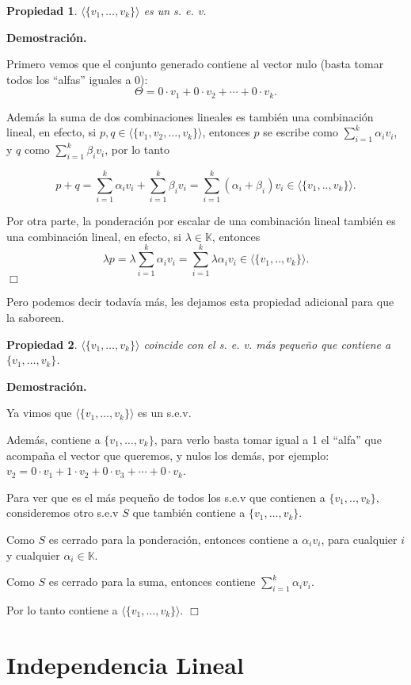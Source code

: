 \documentclass[12pt]{book}
\newtheorem{prop}{Propiedad}
\def\K{\mathbb{K}}
\begin{document}
\begin{prop}
$\langle \{v_1,\dots,v_k\}\rangle$ es un s. e. v.
\end{prop}
{\bf Demostración.} {
Primero vemos que el conjunto generado contiene al vector nulo (basta tomar todos los ``alfas'' iguales a 0): 
$$\Theta=0\cdot v_1+0\cdot v_2+\cdots+0\cdot v_k.$$

Además la suma de dos combinaciones lineales es también una combinación lineal, en efecto, si $p,q\in\langle\{v_1,v_2,\dots,v_k\}\rangle$, entonces $p$ se escribe como $\sum_{i=1}^k\alpha_iv_i$, y $q$ como $\sum_{i=1}^k\beta_iv_i$, por lo tanto

$$p+q=\sum_{i=1}^k\alpha_iv_i+\sum_{i=1}^k\beta_iv_i=\sum_{i=1}^k(\alpha_i+\beta_i)v_i\in\langle \{v_1,..,v_k\}\rangle.$$

Por otra parte, la ponderación por escalar de una combinación lineal también es una combinación lineal, en efecto, si $\lambda\in\K$, entonces 
$$\lambda p=\lambda\sum_{i=1}^k\alpha_iv_i=\sum_{i=1}^k\lambda\alpha_iv_i\in \langle \{v_1,..,v_k\}\rangle.$$
\hfill $\Box$
    }

Pero podemos decir todavía más, les dejamos esta propiedad adicional para que la saboreen.


\begin{prop}
$\langle \{v_1,\dots,v_k\}\rangle$ coincide con el s. e. v. m\'as peque\~no que contiene a $\{v_1,\dots,v_k\}$.
\end{prop}
    {\bf Demostración.} {
Ya vimos que $\langle \{v_1,\dots,v_k\}\rangle$ es un s.e.v. 

Además, contiene a $\{v_1,\dots,v_k\}$, para verlo basta tomar igual a 1 el ``alfa'' que acompaña el vector que queremos, y nulos los demás, por ejemplo: $v_2=0\cdot v_1+1\cdot v_2+0\cdot v_3+\cdots+0\cdot v_k$.

Para ver que es el más pequeño de todos los s.e.v que contienen a $\{v_1,..,v_k\}$, consideremos otro s.e.v $S$ que también contiene a $\{v_1,\dots,v_k\}$.

Como $S$ es cerrado para la ponderación, entonces contiene a $\alpha_iv_i$, para cualquier $i$ y cualquier $\alpha_i\in\K$.

Como $S$ es cerrado para la suma, entonces contiene $\sum_{i=1}^k\alpha_iv_i$.

Por lo tanto contiene a $\langle \{v_1,\dots,v_k\}\rangle$.
\hfill $\Box$
    }

\section{Independencia Lineal}
\end{document}
